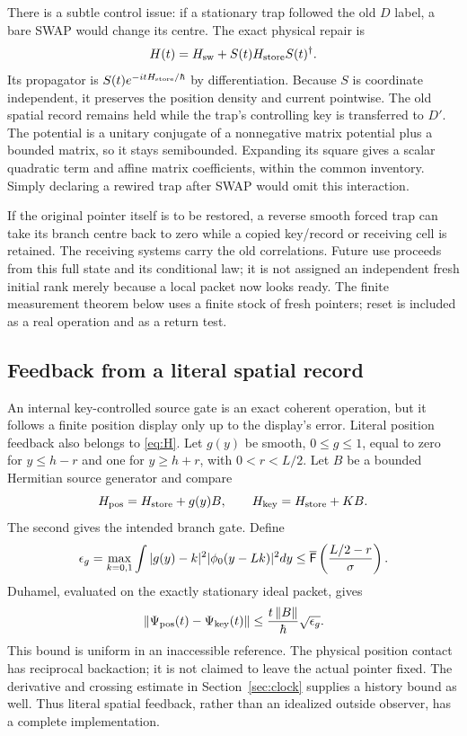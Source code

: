 \documentclass[11pt]{article}
\theoremstyle{definition}\newtheorem{assumption}[theorem]{Constitutive assumption}
\theoremstyle{remark}\newtheorem{remark}[theorem]{Remark}
\newcommand{\norm}[1]{\left\|#1\right\|}\newcommand{\pos}[1]{[#1]_+}
\begin{document}
There is a subtle control issue: if a stationary trap followed the old $D$ label, a bare SWAP would change its centre. The exact physical repair is
\begin{equation}\label{eq:covariantreset}
 H(t)=H_{\rm sw}+S(t)H_{\rm store}S(t)^\dagger.
\end{equation}
Its propagator is $S(t)e^{-itH_{\rm store}/\hbar}$ by differentiation. Because $S$ is coordinate independent, it preserves the position density and current pointwise. The old spatial record remains held while the trap's controlling key is transferred to $D'$. The potential is a unitary conjugate of a nonnegative matrix potential plus a bounded matrix, so it stays semibounded. Expanding its square gives a scalar quadratic term and affine matrix coefficients, within the common inventory. Simply declaring a rewired trap after SWAP would omit this interaction.

If the original pointer itself is to be restored, a reverse smooth forced trap can take its branch centre back to zero while a copied key/record or receiving cell is retained. The receiving systems carry the old correlations. Future use proceeds from this full state and its conditional law; it is not assigned an independent fresh initial rank merely because a local packet now looks ready. The finite measurement theorem below uses a finite stock of fresh pointers; reset is included as a real operation and as a return test.

\subsection{Feedback from a literal spatial record}
An internal key-controlled source gate is an exact coherent operation, but it follows a finite position display only up to the display's error. Literal position feedback also belongs to \eqref{eq:H}. Let $g(y)$ be smooth, $0\le g\le1$, equal to zero for $y\le h-r$ and one for $y\ge h+r$, with $0<r<L/2$. Let $B$ be a bounded Hermitian source generator and compare
\[
 H_{\rm pos}=H_{\rm store}+g(y)B,\qquad
 H_{\rm key}=H_{\rm store}+KB.
\]
The second gives the intended branch gate. Define
\begin{equation}\label{eq:feedbacktail}
 \epsilon_g=\max_{k=0,1}\int |g(y)-k|^2|\phi_0(y-Lk)|^2dy
 \le\overline{\mathsf F}\left(\frac{L/2-r}{\sigma}\right).
\end{equation}
Duhamel, evaluated on the exactly stationary ideal packet, gives
\begin{equation}\label{eq:feedbackbound}
 \norm{\Psi_{\rm pos}(t)-\Psi_{\rm key}(t)}
 \le\frac{t\norm B}{\hbar}\sqrt{\epsilon_g}.
\end{equation}
This bound is uniform in an inaccessible reference. The physical position contact has reciprocal backaction; it is not claimed to leave the actual pointer fixed. The derivative and crossing estimate in Section~\ref{sec:clock} supplies a history bound as well. Thus literal spatial feedback, rather than an idealized outside observer, has a complete implementation.
\end{document}

